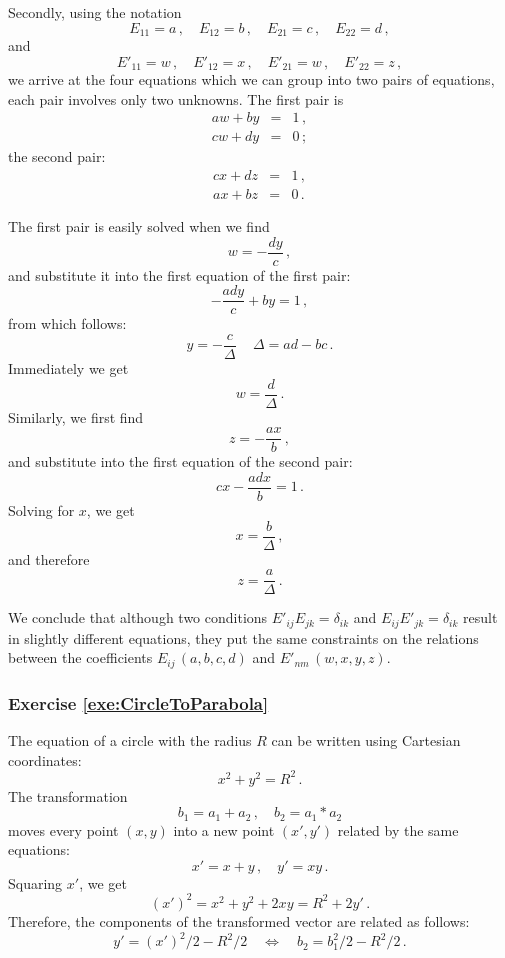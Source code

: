 Secondly, using the notation
\[
E_{11} = a\,,\quad E_{12} = b\,,\quad E_{21} = c\,,\quad E_{22} = d\,,
\]
and
\[
E'_{11} = w\,,\quad E'_{12} = x\,,\quad E'_{21} = w\,,\quad E'_{22} = z\,,
\]
we arrive at the four equations which we can group into two pairs of
equations, each pair involves only two unknowns. The first pair is
\begin{eqnarray*}
  aw + by & = & 1\,,\\
  cw + dy & = & 0\,;
\end{eqnarray*}
the second pair:
\begin{eqnarray*}
  cx + dz & = & 1\,,\\
  ax + bz & = & 0\,.
\end{eqnarray*}

The first pair is easily solved when we find
\[
w = -\frac{dy}{c}\,,
\]
and substitute it into the first equation of the first pair:
\[
-\frac{ady}{c}+by = 1\,,
\]
from which follows:
\[
y = -\frac{c}{\Delta}\,\quad \Delta = ad - bc\,.
\]
Immediately we get
\[
w = \frac{d}{\Delta}\,.
\]
Similarly, we first find
\[
z = -\frac{ax}{b}\,,
\]
and substitute into the first equation of the second pair:
\[
cx -\frac{adx}{b} = 1\,.
\]
Solving for $x$, we get
\[
x = \frac{b}{\Delta}\,,
\]
and therefore
\[
z = \frac{a}{\Delta}\,.
\]

We conclude that although two conditions $E'_{ij}E_{jk} = \delta_{ik}$ and
$E_{ij}E'_{jk} = \delta_{ik}$ result in slightly different equations,
they put the same constraints on the relations between the coefficients
$E_{ij}\,(a,b,c,d)$ and $E'_{nm}\,(w,x,y,z)$.

\subsubsection*{Exercise \ref{exe:CircleToParabola}}
The equation of a circle with the radius $R$ can be written using
Cartesian coordinates:
\[
x^2 + y^2 = R^2\,.
\]
The transformation
\[
b_1 = a_1 + a_2\,,\quad b_2 = a_1 * a_2
\]
moves every point $(x,y)$ into a new point $(x', y')$ related by the
same equations:
\[
x' = x + y\,,\quad y' = xy\,.
\]
Squaring $x'$, we get
\[
(x')^2 = x^2 + y^2 + 2xy = R^2 + 2y'\,.
\]
Therefore, the components of the transformed vector are related as
follows:
\[
y' = (x')^2/2 - R^2/2\quad\Leftrightarrow\quad b_2 = b_1^2/2 - R^2/2\,.
\]


